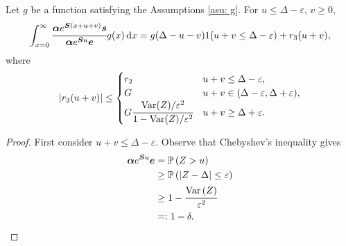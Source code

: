 \begin{cor}\label{cor: cond bnd 2}
	Let \(g\) be a function satisfying the Assumptions \ref{asu: g}. For \(u\leq \Delta-\varepsilon \), \(v\geq 0\), 
	\[\int_{x=0}^\infty \cfrac{\boldsymbol \alpha  e^{\boldsymbol{S} (x+u+v)} \boldsymbol s}{\boldsymbol \alpha  e^{\boldsymbol{S} u} \boldsymbol e} g(x)\, \mathrm{d} x = g(\Delta-u-v) 1(u+v\leq\Delta-\varepsilon) + r_3 (u+v),\]
	where 
	\[\left|r_3 (u+v)\right|\leq \begin{cases} 
		r_2  & u+v\leq \Delta-\varepsilon,\\
		G & u+v\in(\Delta-\varepsilon,\Delta+\varepsilon), \\
		G\cfrac{\mathrm{Var}(Z)/\varepsilon^2}{1-\mathrm{Var}(Z)/\varepsilon^2} & u+v \geq \Delta + \varepsilon.
		\end{cases}\]
\end{cor}
\begin{proof}
	First consider \(u+v \leq \Delta - \varepsilon\). Observe that Chebyshev's inequality gives
	\begin{align*}
		\boldsymbol \alpha e^{\boldsymbol Su}\boldsymbol e&=\mathbb P\left(Z >u\right) 
		\\&\geq \mathbb P\left(|Z -\Delta|\leq \varepsilon \right) 
		\\&\geq 1 - \cfrac{\mathrm{Var}\left(Z \right)}{\varepsilon ^2} 
		\\&=: 1-\delta .
	\end{align*}
	

\end{proof}
